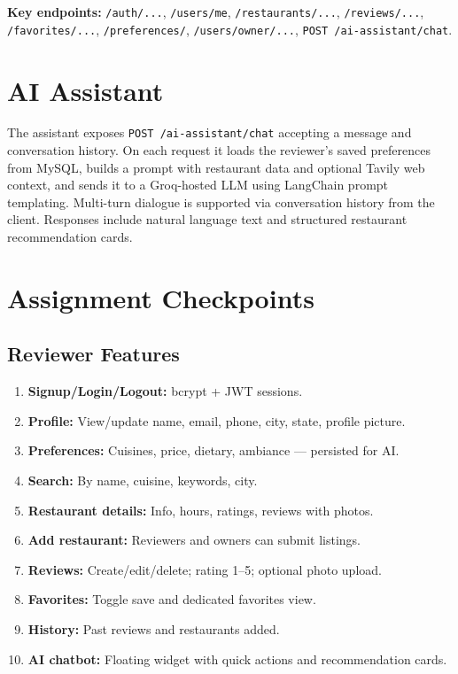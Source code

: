 \documentclass[onecolumn,journal]{IEEEtran}
\begin{document}
\textbf{Key endpoints:} \texttt{/auth/...}, \texttt{/users/me}, \texttt{/restaurants/...}, \texttt{/reviews/...}, \texttt{/favorites/...}, \texttt{/preferences/}, \texttt{/users/owner/...}, \texttt{POST /ai-assistant/chat}.

\section{AI Assistant}
\label{sec:ai}

The assistant exposes \texttt{POST /ai-assistant/chat} accepting a message and conversation history. On each request it loads the reviewer's saved preferences from MySQL, builds a prompt with restaurant data and optional Tavily web context, and sends it to a Groq-hosted LLM using LangChain prompt templating. Multi-turn dialogue is supported via conversation history from the client. Responses include natural language text and structured restaurant recommendation cards.

\section{Assignment Checkpoints}
\label{sec:req}

\subsection{Reviewer Features}
\begin{enumerate}
  \item \textbf{Signup/Login/Logout:} bcrypt + JWT sessions.
  \item \textbf{Profile:} View/update name, email, phone, city, state, profile picture.
  \item \textbf{Preferences:} Cuisines, price, dietary, ambiance --- persisted for AI.
  \item \textbf{Search:} By name, cuisine, keywords, city.
  \item \textbf{Restaurant details:} Info, hours, ratings, reviews with photos.
  \item \textbf{Add restaurant:} Reviewers and owners can submit listings.
  \item \textbf{Reviews:} Create/edit/delete; rating 1--5; optional photo upload.
  \item \textbf{Favorites:} Toggle save and dedicated favorites view.
  \item \textbf{History:} Past reviews and restaurants added.
  \item \textbf{AI chatbot:} Floating widget with quick actions and recommendation cards.
\end{enumerate}
\end{document}
